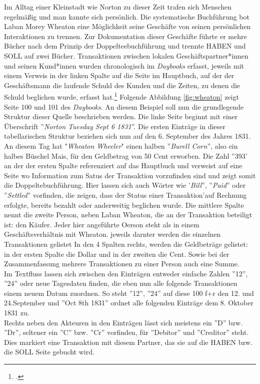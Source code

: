 \documentclass[12pt,a4paper]{article}
\begin{document}
Im Alltag einer Kleinstadt wie Norton zu dieser Zeit trafen sich Menschen regelmäßig und man kannte sich persönlich. Die systematische Buchführung bot Laban Morey Wheaton eine Möglichkeit seine Geschäfte von seinen persönlichen Interaktionen zu trennen. Zur Dokumentation dieser Geschäfte führte er mehre Bücher nach dem Prinzip der Doppelteebuchführung und trennte HABEN und SOLL auf zwei Bücher. Transaktionen zwischen lokalen Geschäftspartner*innen und seinen Kund*innen wurden chronologisch im \textit{Daybooks} erfasst, jeweils mit einem Verweis in der linken Spalte auf die Seite im Hauptbuch, auf der der Geschäftsmann die laufende Schuld des Kunden und die Zeiten, zu denen die Schuld beglichen wurde, erfasst hat.\footcite[][S.7-9]{tomasek2013encoding} Folgende Abbildung \ref{fig:wheaton} zeigt Seite 100 und 101 des \textit{Daybooks}. An diesem Beispiel soll nun die grundlegende Struktur dieser Quelle beschrieben werden. Die linke Seite beginnt mit einer Überschrift ''\textit{Norton Tuesday Sept 6 1831}''. Die ersten Einträge in dieser tabellarischen Struktur beziehen sich nun auf den 6. September des Jahres 1831. An diesem Tag hat "\textit{Wheaton Wheeler}" einen halben ''\textit{Burell Corn}'', also ein halbes Büschel Mais, für den Geldbetrag von 50 Cent erworben. Die Zahl ''393' an der der ersten Spalte  referenziert auf das Hauptbuch und verweist auf eine Seite wo Information zum Satus der Transaktion vorzufinden sind und zeigt somit die Doppeltebuchführung. Hier lassen sich auch Wörter wie '\textit{Bill}'', ''\textit{Paid}'' oder ''\textit{Settled}'' vorfinden, die zeigen, dass der Status einer Transaktion'auf Rechnung erfolgte, bereits bezahlt oder anderweitig beglichen wurde. Die mittlere Spalte nennt die zweite Person, neben Laban Wheaton, die an der Transaktion beteiligt ist: den Käufer. Jeder hier angeführte Oerson steht als in einem Geschäftsverhältnis mit Wheaton. jeweils darnter werden die einzelnen Transaktionen gelistet In den 4 Spalten rechts, werden die Geldbeträge gelistet: in der ersten Spalte die Dollar und in der zweiten die Cent. Sowie bei der Zusammenfassung mehrere Transaktionen zu einer Person auch eine Summe.
\\
Im Textfluss lassen sich zwischen den Einträgen entweder einfache Zahlen ''12'', ''24'' oder neue Tagesdaten finden, die eben nun alle folgende Transaktionen einem neuem Datum zuordnen. So steht ''12'', ''24'' auf diese 100 f+r den 12. und 24.September und ''Oct 8th 1831'' ordnet alle folgenden Einträge  dem 8. Oktober 1831 zu.
\\
Rechts neben den Akteuren in den Einträgen lässt sich meistens ein ''D'' bzw. ''Dr'', seltener ein ''C'' bzw. ''Cr'' vorfinden, für ''Debitor'' und ''Creditor'' steht. Dies markiert eine Transaktion mit diesem Partner, das sie auf die HABEN bzw. die SOLL Seite gebucht wird.
\end{document}
